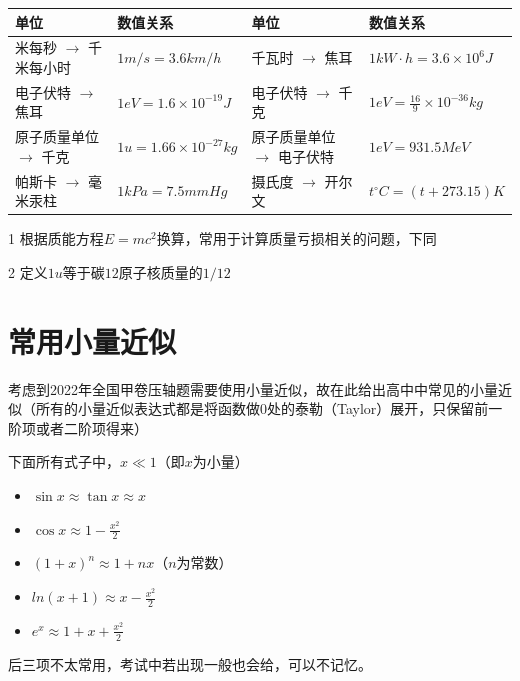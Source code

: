 \begin{table}[h]
\centering
\begin{threeparttable}
\begin{tabular}{|l|l||l|l|}
\hline
\textbf{单位}  & \textbf{数值关系} & \textbf{单位} & \textbf{数值关系}\\
\hline
米每秒 $\to$ 千米每小时  & $1m/s = 3.6km/h$ & 千瓦时 $\to$ 焦耳 & $1kW \cdot h = 3.6 \times 10^{6} J$\\
电子伏特 $\to$ 焦耳  & $1eV = 1.6 \times 10^{-19}J$ & 电子伏特 $\to$ 千克\tnote{1} & $1eV = \frac{16}{9} \times 10^{-36} kg$\\
原子质量单位\tnote{2} $\to$ 千克  & $1u = 1.66 \times 10^{-27}kg$ & 原子质量单位 $\to$ 电子伏特 & $1eV = 931.5 MeV$\\
帕斯卡 $\to$ 毫米汞柱  & $1kPa = 7.5 mmHg$ & 摄氏度 $\to$ 开尔文 & $t^{\circ}C = (t + 273.15)K$\\
\hline

\hline
\end{tabular}
\begin{tablenotes}
\item[1] 根据质能方程$E=mc^2$换算，常用于计算质量亏损相关的问题，下同
\item[2] 定义$1u$等于碳$12$原子核质量的$1/12$
\end{tablenotes}
\end{threeparttable}
\end{table}

\section{常用小量近似}
\label{s_xljs}

考虑到2022年全国甲卷压轴题需要使用小量近似，故在此给出高中中常见的小量近似（所有的小量近似表达式都是将函数做0处的泰勒（Taylor）展开，只保留前一阶项或者二阶项得来）

下面所有式子中，$x \ll 1$（即$x$为小量）

\begin{itemize}
\item $\sin x \approx \tan x \approx x$
\item $\cos x \approx 1 - \frac{x^2}{2}$
\item $(1+x)^n \approx 1 + nx$（$n$为常数）
\item $ln(x+1) \approx x - \frac{x^2}{2}$
\item $e^x \approx 1 + x + \frac{x^2}{2}$
\end{itemize}

后三项不太常用，考试中若出现一般也会给，可以不记忆。

